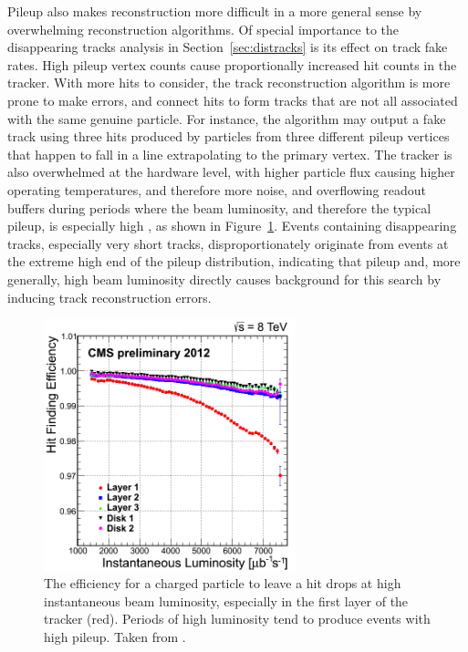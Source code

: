     Pileup also makes reconstruction more difficult in a more general sense by overwhelming reconstruction algorithms.
    Of special importance to the disappearing tracks analysis in Section~\ref{sec:distracks} is its effect on track fake rates.
    High pileup vertex counts cause proportionally increased hit counts in the tracker.
    With more hits to consider, the track reconstruction algorithm is more prone to make errors, and connect hits to form tracks that are not all associated with the same genuine particle.
    For instance, the algorithm may output a fake track using three hits produced by particles from three different pileup vertices that happen to fall in a line extrapolating to the primary vertex.
    The tracker is also overwhelmed at the hardware level, with higher particle flux causing higher operating temperatures, and therefore more noise, and overflowing readout buffers during periods where the beam luminosity, and therefore the typical pileup, is especially high \cite{cms_tracker}, as shown in Figure~\ref{fig:hitefflumi}.
    Events containing disappearing tracks, especially very short tracks, disproportionately originate from events at the extreme high end of the pileup distribution, indicating that pileup and, more generally, high beam luminosity directly causes background for this search by inducing track reconstruction errors.

    \begin{figure}[h!]
      \centering
      \includegraphics[width=0.65\textwidth]{figures/HitEff_vs_InstLumi.png}
      \caption[Hit efficiency as a function of instantaneous beam luminosity.]{
        The efficiency for a charged particle to leave a hit drops at high instantaneous beam luminosity, especially in the first layer of the tracker (red).
        Periods of high luminosity tend to produce events with high pileup.
        Taken from \cite{cms_tracker}.}
      \label{fig:hitefflumi}
    \end{figure}  

